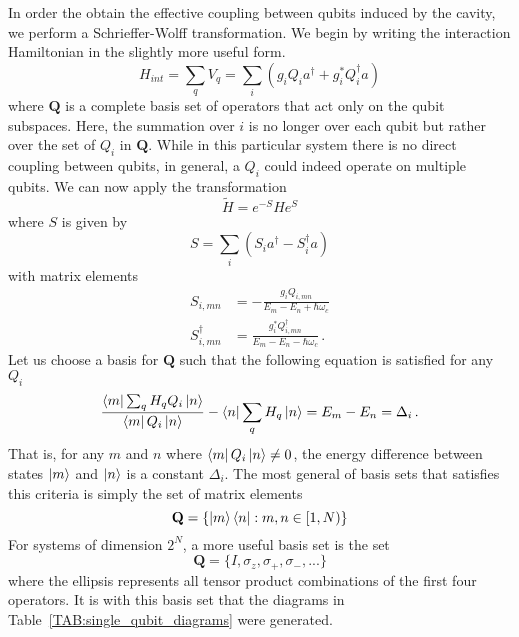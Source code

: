 \documentclass[11pt]{article}
\theoremstyle{definition}
\begin{document}
In order the obtain the effective coupling between qubits induced by the cavity, we perform a Schrieffer-Wolff transformation.
We begin by writing the interaction Hamiltonian in the slightly more useful form.
\begin{equation}
    H_{int} = \sum_q V_q  =\sum_i (g_iQ_ia^\dagger + g_i^*Q_i^\dagger a)
\end{equation}
where $\mathbf{Q}$ is a complete basis set of operators that act only on the qubit subspaces.
Here, the summation over $i$ is no longer over each qubit but rather over the set of $Q_i$ in $\mathbf{Q}$.
While in this particular system there is no direct coupling between qubits, in general, a $Q_i$ could indeed operate on multiple qubits.
We can now apply the transformation
\begin{equation}
    \tilde{H} = e^{-S}He^S
\end{equation}
where $S$ is given by
\begin{equation}
    S = \sum_i (S_ia^\dagger - S_i^\dagger a)
\end{equation}
with matrix elements
\begin{align}
    S_{i,mn}         & = -\frac{g_i Q_{i,mn}}{E_m-E_n+\hbar\omega_c}             \\
    S^\dagger_{i,mn} & = \frac{g_i^*Q^\dagger_{i,mn}}{E_m-E_n-\hbar\omega_c} \,.
\end{align}
Let us choose a basis for $\mathbf{Q}$ such that the following equation is satisfied for any $Q_i$
\begin{equation}
    \frac{\bra{m} \sum_q H_q Q_i \ket{n}}{\bra{m}Q_i\ket{n}}- \bra{n}\sum_qH_q\ket{n} = E_m-E_n = \Delta_i \,.
\end{equation}
That is, for any $m$ and $n$ where $\bra{m}Q_i \ket{n} \ne 0$, the energy difference between states $\ket{m}$ and $\ket{n}$ is a constant $\Delta_i$.
The most general of basis sets that satisfies this criteria is simply the set of matrix elements
\begin{equation}
    \mathbf{Q} = \{ \ket{m}\bra{n}:m,n \in  [1,N) \}
\end{equation}
For systems of dimension $2^N$, a more useful basis set is the set
\begin{equation}\label{EQ:Q_criteria}
    \mathbf{Q}  =\{ I, \sigma_z, \sigma_+, \sigma_-, ... \}
\end{equation}
where the ellipsis represents all tensor product combinations of the first four operators.
It is with this basis set that the diagrams in Table~\ref{TAB:single_qubit_diagrams} were generated.
\end{document}
